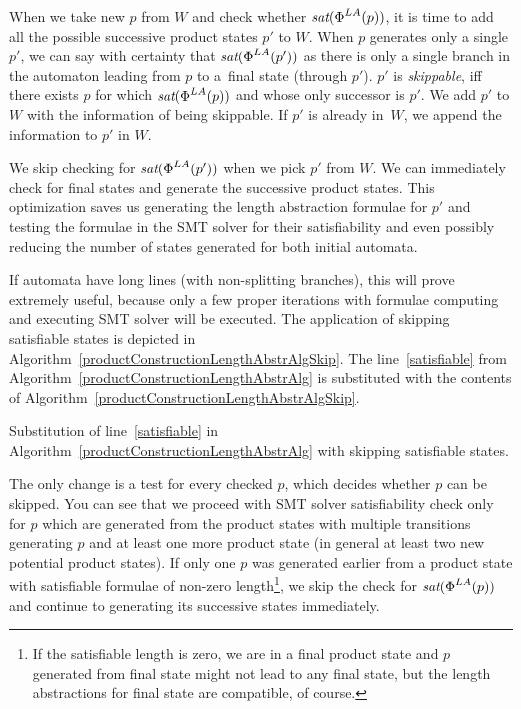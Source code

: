 When we take new $p$ from $W$ and check whether $\emph{sat}(\emph{$\Phi$}^{LA}(p))$, it is time to add all the possible successive product states $p'$ to $W$. When $p$ generates only a single $p'$, we can say with certainty that $\emph{sat}(\emph{$\Phi$}^{LA}(p'))$ as there is only a single branch in the automaton leading from $p$ to a~final state (through $p'$). $p'$ is \emph{skippable}, iff there exists $p$ for which $\emph{sat}(\emph{$\Phi$}^{LA}(p))$ and whose only successor is $p'$. We add $p'$ to $W$ with the information of being skippable. If $p'$ is already in~$W$, we append the information to $p'$ in $W$.

We skip checking for $\emph{sat}(\emph{$\Phi$}^{LA}(p'))$ when we pick $p'$ from $W$. We can immediately check for final states and generate the successive product states. This optimization saves us generating the length abstraction formulae for $p'$ and testing the formulae in the SMT solver for their satisfiability and even possibly reducing the number of states generated for both initial automata.

If automata have long lines (with non-splitting branches), this will prove extremely useful, because only a few proper iterations with formulae computing and executing SMT solver will be executed. The application of skipping satisfiable states is depicted in Algorithm~\ref{productConstructionLengthAbstrAlgSkip}. The line~\ref{satisfiable} from Algorithm~\ref{productConstructionLengthAbstrAlg} is substituted with the contents of Algorithm~\ref{productConstructionLengthAbstrAlgSkip}.

\begin{algorithm}
    \caption{Substitution of line~\ref{satisfiable} in Algorithm~\ref{productConstructionLengthAbstrAlg} with skipping satisfiable states.} \label{productConstructionLengthAbstrAlgSkip}
    \DontPrintSemicolon
\end{algorithm}

The only change is a test for every checked $p$, which decides whether $p$ can be skipped. You can see that we proceed with SMT solver satisfiability check only for $p$ which are generated from the product states with multiple transitions generating $p$ and at least one more product state (in general at least two new potential product states). If only one $p$ was generated earlier from a product state with satisfiable formulae of non-zero length\footnote{If the satisfiable length is zero, we are in a final product state and $p$ generated from final state might not lead to any final state, but the length abstractions for final state are compatible, of course.}, we skip the check for $\emph{sat}(\emph{$\Phi$}^{LA}(p))$ and continue to generating its successive states immediately.

